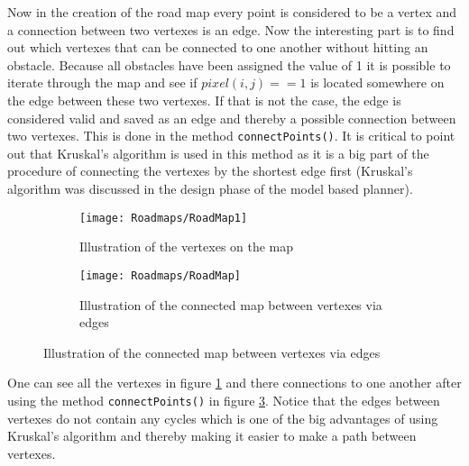 \documentclass[../Head/Main.tex]{subfiles}
\begin{document}
Now in the creation of the road map every point is considered to be a vertex and a connection between two vertexes is an edge. Now the interesting part is to find out which vertexes that can be connected to one another without hitting an obstacle. Because all obstacles have been assigned the value of 1 it is possible to iterate through the map and see if $pixel(i,j) == 1$ is located somewhere on the edge between these two vertexes. If that is not the case, the edge is considered valid and saved as an edge and thereby a possible connection between two vertexes. This is done in the method \texttt{connectPoints()}. It is critical to point out that Kruskal's algorithm is used in this method as it is a big part of the procedure of connecting the vertexes by the shortest edge first (Kruskal's algorithm was discussed in the design phase of the model based planner). 

  \begin{figure}[H]
   \begin{subfigure}[b]{0.49\textwidth}
    \centering
    \texttt{[image: Roadmaps/RoadMap1]}
    \caption{Illustration of the vertexes on the map}
    \label{fig:Vertexes}
  \end{subfigure}
  \hfill
   \begin{subfigure}[b]{0.49\textwidth}
    \centering
    \texttt{[image: Roadmaps/RoadMap]}
    \caption{Illustration of the connected map between vertexes via edges}
    \label{fig:VertexesAndEdges}
  \end{subfigure}
  \end{figure}  
  
One can see all the vertexes in figure \ref{fig:Vertexes} and there connections to one another after using the method \texttt{connectPoints()} in figure \ref{fig:VertexesAndEdges}. Notice that the edges between vertexes do not contain any cycles which is one of the big advantages of using Kruskal's algorithm and thereby making it easier to make a path between vertexes.  
\end{document}
